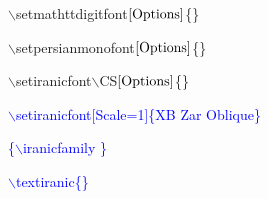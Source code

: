 \begin{plainslide}
\begin{itemize}
\begin{latin}
    \item {$\backslash$setmathttdigitfont$\left[\rm Options\right]$\{\}\hfill\textcolor{black}{}}\\  
    \item {$\backslash$setpersianmonofont$\left[\rm Options\right]$\{\}\hfill\textcolor{black}{}}\\
    \item {$\backslash$setiranicfont$\backslash$CS$\left[\rm Options\right]$\{\}\hfill\textcolor{black}{}}\\
	{%
\begin{flushright}
\textcolor{black}{}
\end{flushright}
\textcolor{blue}{$\backslash$setiranicfont[Scale=1]\{XB Zar Oblique\}}
\begin{flushright}
\hfill\textcolor{black}{}
\end{flushright}
\textcolor{blue}{\{$\backslash$iranicfamily  \}}
\begin{flushright}
\hfill\textcolor{black}{}
\end{flushright}
\textcolor{blue}{$\backslash$textiranic\{\}}
}
\end{latin}
\end{itemize}
\end{plainslide}

